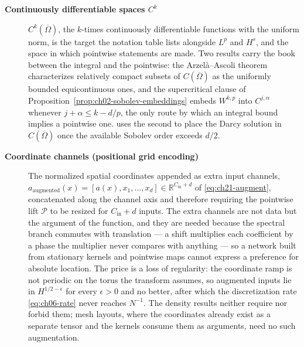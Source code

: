 \begin{description}
\item[\textbf{Continuously differentiable spaces $C^{k}$}] $C^{k}(\overline{\Omega})$,
the $k$-times continuously differentiable functions with the uniform norm, is the
target the notation table lists alongside $L^{p}$ and $H^{s}$, and the space in which
pointwise statements are made. Two results carry the book between the integral and
the pointwise: the Arzel\`a--Ascoli theorem characterizes relatively compact subsets
of $C(\overline{\Omega})$ as the uniformly bounded equicontinuous ones, and the
supercritical clause of Proposition~\ref{prop:ch02-sobolev-embeddings} embeds
$W^{k,p}$ into $C^{j,\alpha}$ whenever $j + \alpha \le k - d/p$, the only route by
which an integral bound implies a pointwise one. 
uses the second to place the Darcy solution in $C(\overline{\Omega})$ once the
available Sobolev order exceeds $d/2$.

\item[\textbf{Coordinate channels (positional grid encoding)}] The normalized spatial
coordinates appended as extra input channels, $a_{\text{augmented}}(x) =
[a(x), x_{1}, \dots, x_{d}] \in \mathbb{R}^{C_{\text{in}} + d}$ of
\eqref{eq:ch21-augment}, concatenated along the channel axis and therefore requiring
the pointwise lift $\mathcal{P}$ to be resized for $C_{\text{in}} + d$ inputs. The
extra channels are not data but the argument of the function, and they are needed
because the spectral branch commutes with translation --- a shift multiplies each
coefficient by a phase the multiplier never compares with anything --- so a network
built from stationary kernels and pointwise maps cannot express a preference for
absolute location. The price is a loss of regularity: the coordinate ramp is not
periodic on the torus the transform assumes, so augmented inputs lie in
$H^{1/2 - \epsilon}$ for every $\epsilon > 0$ and no better, after which the
discretization rate \eqref{eq:ch06-rate} never reaches $N^{-1}$. The density results
neither require nor forbid them; mesh layouts, where the coordinates already exist as
a separate tensor and the kernels consume them as arguments, need no such
augmentation. 


\end{description}
